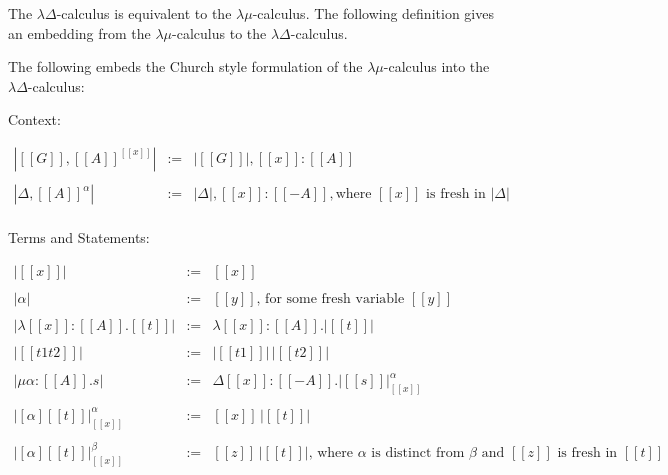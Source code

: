 The $\lambda\Delta$-calculus is equivalent to the $\lambda\mu$-calculus.  The
following definition gives an embedding from the $\lambda\mu$-calculus to
the $\lambda\Delta$-calculus.
\begin{definition}
  \label{def:lamd_embed_lamu}
  The following embeds the Church style formulation of the $\lambda\mu$-calculus into
  the $\lambda\Delta$-calculus:
  
  \noindent
  Context:
  \begin{center}
    \begin{math}
      \begin{array}{lll}
        |[[G]],[[A]]^[[x]]| & := & |[[G]]|,[[x]]:[[A]]\\
        &\\
        |\Delta,[[A]]^\alpha| & := & |\Delta|,[[x]]:[[{-A}]], \text{where } [[x]] \text{ is fresh in } |\Delta|\\
      \end{array}
    \end{math}
  \end{center}

  \noindent
  Terms and Statements:
  \begin{center}
    \begin{math}
      \begin{array}{lll}
        |[[x]]|  & := & [[x]]\\
        &\\
        |\alpha| & := & [[y]] \text{, for some fresh variable } [[y]]\\
        &\\
        |\lambda [[x]]:[[A]].[[t]]| & := & \lambda [[x]]:[[A]].|[[t]]|\\
        &\\
        |[[t1 t2]]|  & := & |[[t1]]|\,|[[t2]]|\\
        &\\
        |\mu \alpha:[[A]].s| & := & \Delta [[x]]:[[{-A}]].|[[s]]|^{\alpha}_{[[x]]} \\
        &\\
        |[\alpha][[t]]|^{\alpha}_{[[x]]} & := & [[x]]\,|[[t]]|\\          
        & \\
        |[\alpha][[t]]|^{\beta}_{[[x]]} & := & [[z]]\,|[[t]]|
          \text{, where } \alpha \text{ is distinct from } \beta \text{ and } [[z]] \text{ is fresh in } [[t]]
      \end{array}
    \end{math}
  \end{center}
\end{definition}
